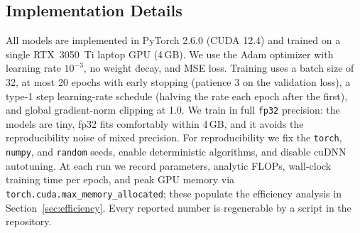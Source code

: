 \subsection{Implementation Details}
\label{sec:exp:impl}

All models are implemented in PyTorch 2.6.0 (CUDA 12.4) and trained on a single
RTX~3050~Ti laptop GPU (4\,GB). We use the Adam optimizer \citep{kingma2015adam}
with learning rate $10^{-3}$, no weight decay, and MSE loss. Training uses a
batch size of 32, at most 20 epochs with early stopping (patience 3 on the
validation loss), a type-1 step learning-rate schedule (halving the rate each
epoch after the first), and global gradient-norm clipping at 1.0. We train in
full \texttt{fp32} precision: the models are tiny, fp32 fits comfortably within
4\,GB, and it avoids the reproducibility noise of mixed precision. For
reproducibility we fix the \texttt{torch}, \texttt{numpy}, and \texttt{random}
seeds, enable deterministic algorithms, and disable cuDNN autotuning. At each
run we record parameters, analytic FLOPs, wall-clock training time per epoch, and
peak GPU memory via \texttt{torch.cuda.max\_memory\_allocated}; these populate the
efficiency analysis in Section~\ref{sec:efficiency}. Every reported number is
regenerable by a script in the repository.
